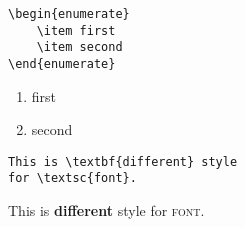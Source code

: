\documentclass{article}
\begin{document}
\begin{minipage}[t]{0.6\textwidth}
\begin{lstlisting}
\begin{enumerate}
    \item first
    \item second
\end{enumerate}
\end{lstlisting}
\end{minipage}
\hfill
\begin{minipage}[t]{0.3\textwidth}
\begin{enumerate}
    \item first
    \item second
\end{enumerate}
\end{minipage}


\begin{minipage}[t]{0.6\textwidth}
\begin{lstlisting}
This is \textbf{different} style 
for \textsc{font}.
\end{lstlisting}
\end{minipage}
\hfill
\begin{minipage}[t]{0.3\textwidth}
    This is \textbf{different} style for \textsc{font}.
\end{minipage}
\end{document}
